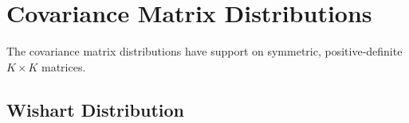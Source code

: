 








\chapter{Covariance Matrix Distributions}

\noindent
The covariance matrix distributions have support on symmetric,
positive-definite $K \times K$ matrices.


\section{Wishart Distribution}

